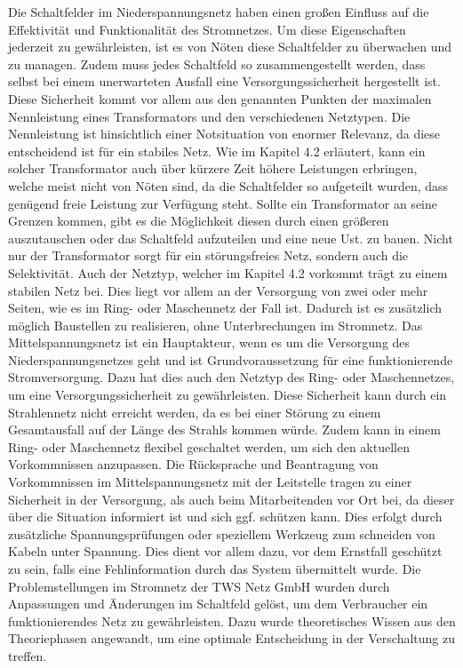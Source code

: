 Die Schaltfelder im Niederspannungsnetz haben einen großen Einfluss auf die Effektivität und Funktionalität des Stromnetzes. Um diese Eigenschaften jederzeit 
zu gewährleisten, ist es von Nöten diese Schaltfelder zu überwachen und zu managen. Zudem muss jedes Schaltfeld so zusammengestellt werden, dass selbst bei 
einem unerwarteten Ausfall eine Versorgungssicherheit hergestellt ist. Diese Sicherheit kommt vor allem aus den genannten Punkten der maximalen Nennleistung 
eines Transformators und den verschiedenen Netztypen. Die Nennleistung ist hinsichtlich einer Notsituation von enormer Relevanz, da diese entscheidend ist 
für ein stabiles Netz. Wie im Kapitel 4.2 erläutert, kann ein solcher Transformator auch über kürzere Zeit höhere Leistungen erbringen, welche meist nicht 
von Nöten sind, da die Schaltfelder so aufgeteilt wurden, dass genügend freie Leistung zur Verfügung steht. Sollte ein Transformator an seine Grenzen kommen, 
gibt es die Möglichkeit diesen durch einen größeren auszutauschen oder das Schaltfeld aufzuteilen und eine neue Ust. zu bauen. Nicht nur der Transformator 
sorgt für ein störungsfreies Netz, sondern auch die Selektivität.  Auch der Netztyp, welcher im Kapitel 4.2 vorkommt trägt zu einem stabilen Netz bei. Dies 
liegt vor allem an der Versorgung von zwei oder mehr Seiten, wie es im Ring- oder Maschennetz der Fall ist. Dadurch ist es zusätzlich möglich Baustellen zu 
realisieren, ohne Unterbrechungen im Stromnetz. Das Mittelspannungsnetz ist ein Hauptakteur, wenn es um die Versorgung des Niederspannungsnetzes geht und 
ist Grundvoraussetzung für eine funktionierende Stromversorgung. Dazu hat dies auch den Netztyp des Ring- oder Maschennetzes, um eine Versorgungssicherheit 
zu gewährleisten. Diese Sicherheit kann durch ein Strahlennetz nicht erreicht werden, da es bei einer Störung zu einem Gesamtausfall auf der Länge des 
Strahls kommen würde. Zudem kann in einem Ring- oder Maschennetz flexibel geschaltet werden, um sich den aktuellen Vorkommnissen anzupassen. Die Rücksprache 
und Beantragung von Vorkommnissen im Mittelspannungsnetz mit der Leitstelle tragen zu einer Sicherheit in der Versorgung, als auch beim Mitarbeitenden vor 
Ort bei, da dieser über die Situation informiert ist und sich ggf. schützen kann. Dies erfolgt \zB durch zusätzliche Spannungsprüfungen oder speziellem 
Werkzeug zum schneiden von Kabeln unter Spannung. Dies dient vor allem dazu, vor dem Ernstfall geschützt zu sein, falls eine Fehlinformation durch das 
System übermittelt wurde. Die Problemstellungen im Stromnetz der TWS Netz GmbH wurden durch Anpassungen und Änderungen im Schaltfeld gelöst, um dem 
Verbraucher ein funktionierendes Netz zu gewährleisten. Dazu wurde theoretisches Wissen aus den Theoriephasen angewandt, um eine optimale Entscheidung in 
der Verschaltung zu treffen. 

\clearpage